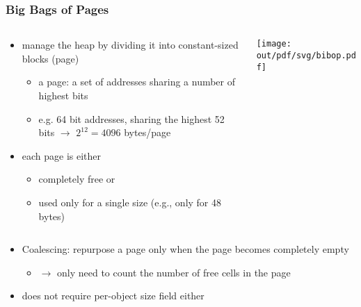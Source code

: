 \documentclass[11pt,dvipdfmx]{beamer}
\newif\ifja
\newif\ifeng
\begin{document}
\begin{frame}[fragile]
\frametitle{Big Bags of Pages}
\begin{columns}
\begin{column}{0.65\textwidth}
\begin{itemize}
\item manage the heap by dividing it into constant-sized blocks (page)
  \begin{itemize}
  \item a page: a set of addresses sharing a number of highest bits
  \item e.g. 64 bit addresses, sharing the highest 52 bits $\rightarrow$ 
    $2^{12}=4096$ bytes/page
  \end{itemize}
\item each page is either
  \begin{itemize}
  \item completely free or
  \item used only for a single size (e.g., only for 48 bytes)
  \end{itemize}
\end{itemize}
\end{column}
\begin{column}{0.35\textwidth}
\begin{center}
\texttt{[image: out/pdf/svg/bibop.pdf]}
\end{center}
\end{column}
\end{columns}

\begin{itemize}
\item Coalescing:
  repurpose a page only when the page becomes completely empty
  \begin{itemize}
  \item $\rightarrow$ only need to count the number of free cells in the page
  \end{itemize}
\item does not require per-object size field either
\end{itemize}

\end{frame}
\fi

\ifja
\subsection{マーク\&スイープGCの性能改善}
\fi
\ifeng
\end{document}
